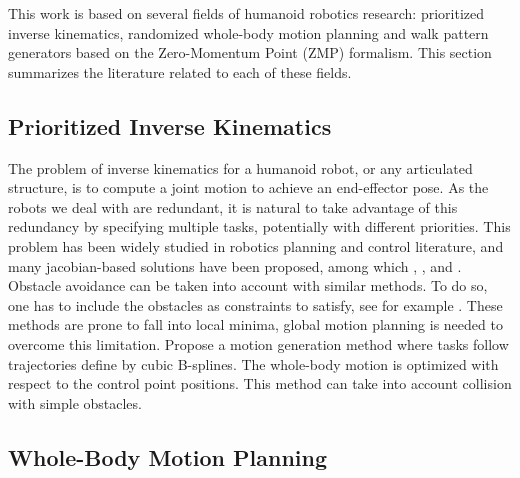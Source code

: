 \documentclass{article}
\begin{document}
This work is based on several fields of humanoid robotics
research: prioritized inverse kinematics, randomized  whole-body  motion
planning and walk pattern generators based on the Zero-Momentum
Point (ZMP) formalism. This section summarizes the literature related to each of 
these fields.

\subsection{Prioritized Inverse Kinematics}

The problem of inverse kinematics for a humanoid robot, or any articulated
structure, is to compute a joint motion to achieve an end-effector pose. As the
robots we deal with are redundant, it is natural to take advantage of
this redundancy by specifying multiple tasks, potentially with
different priorities. This problem has been widely studied in robotics
planning and control literature, and many jacobian-based solutions have been
proposed, among which 
\cite{nakamura1986iks}, \cite{siciliano1991gfm},
\cite{baerlocher1998tpf} and \cite{khatib2004wbd}.
Obstacle avoidance can be taken into account with similar methods. To
do so, one has to include the obstacles as  constraints to
satisfy, see for example \cite{kanehiro2008lca}.
These methods are prone to fall into local minima, global motion 
planning is needed to overcome this limitation.
\cite{TouGieGoe2007} Propose a motion generation method where tasks follow
trajectories define by cubic B-splines. The whole-body motion is optimized
with respect to the control point positions. This method can take into account
collision with simple obstacles.

\subsection{Whole-Body Motion Planning}
\end{document}
